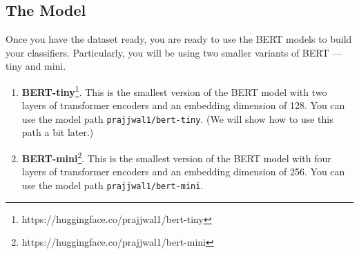 \subsection{The Model}
Once you have the dataset ready, you are ready to use the BERT models to build your classifiers. Particularly, you will be using two smaller variants of BERT --- tiny and mini. 
\begin{enumerate}
    \item \textbf{BERT-tiny}\footnote{https://huggingface.co/prajjwal1/bert-tiny}. This is the smallest version of the BERT model with two layers of transformer encoders and an embedding dimension of 128. You can use the model path \texttt{prajjwal1/bert-tiny}. (We will show how to use this path a bit later.)
     \item \textbf{BERT-mini}\footnote{https://huggingface.co/prajjwal1/bert-mini}. This is the smallest version of the BERT model with four layers of transformer encoders and an embedding dimension of 256. You can use the model path \texttt{prajjwal1/bert-mini}.
\end{enumerate}

